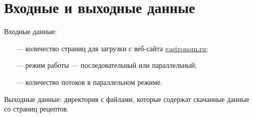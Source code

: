 \chapter{Входные и выходные данные}

Входные данные: 
\begin{itemize}
    \item[---] количество страниц для загрузки с веб-сайта \url{gastronom.ru};
    \item[---] режим работы --- последовательный или параллельный;
    \item[---] количество потоков в параллельном режиме.
\end{itemize}

Выходные данные: директория с файлами, которые содержат скачанные данные со страниц рецептов.

\clearpage